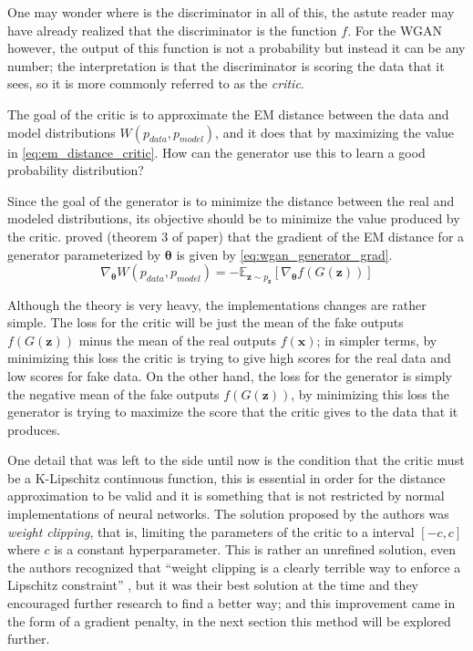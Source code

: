 One may wonder where is the discriminator in all of this, the astute reader may have already realized that the discriminator is the function $f$. For the \gls{WGAN} however, the output of this function is not a probability but instead it can be any number; the interpretation is that the discriminator is scoring the data that it sees, so it is more commonly referred to as the \textit{critic}.

The goal of the critic is to approximate the \gls{EM} distance between the data and model distributions $W(p_{data}, p_{model})$, and it does that by maximizing the value in \autoref{eq:em_distance_critic}. How can the generator use this to learn a good probability distribution?

Since the goal of the generator is to minimize the distance between the real and modeled distributions, its objective should be to minimize the value produced by the critic. \textcite{wasserstein2017} proved (theorem 3 of paper) that the gradient of the \gls{EM} distance for a generator parameterized by $\bm{\theta}$ is given by \autoref{eq:wgan_generator_grad}.
\begin{equation} \label{eq:wgan_generator_grad}
    \nabla_{\bm{\theta}} W(p_{data}, p_{model}) = -\mathbb{E}_{\bm{z}\sim p_{\bm{z}}}{
        \left\lbrack \nabla_{\bm{\theta}}f(G(\bm{z})) \right\rbrack
    }
\end{equation}

Although the theory is very heavy, the implementations changes are rather simple. The loss for the critic will be just the mean of the fake outputs $f(G(\bm{z}))$ minus the mean of the real outputs $f(\bm{x})$; in simpler terms, by minimizing this loss the critic is trying to give high scores for the real data and low scores for fake data. On the other hand, the loss for the generator is simply the negative mean of the fake outputs $f(G(\bm{z}))$, by minimizing this loss the generator is trying to maximize the score that the critic gives to the data that it produces.

One detail that was left to the side until now is the condition that the critic must be a K-Lipschitz continuous function, this is essential in order for the distance approximation to be valid and it is something that is not restricted by normal implementations of neural networks. The solution proposed by the authors was \textit{weight clipping}, that is, limiting the parameters of the critic to a interval $\left\lbrack-c, c\right\rbrack$ where $c$ is a constant hyperparameter. This is rather an unrefined solution, even the authors recognized that ``weight clipping is a clearly terrible way to enforce a Lipschitz constraint'' \cite{wasserstein2017}, but it was their best solution at the time and they encouraged further research to find a better way; and this improvement came in the form of a gradient penalty, in the next section this method will be explored further.

